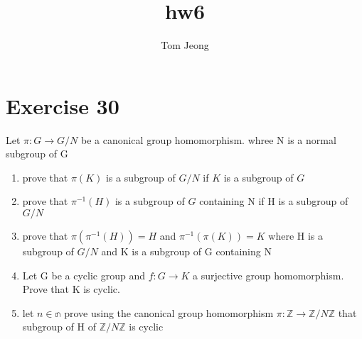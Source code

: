 \documentclass{article}
\begin{document}


\title{hw6}
\author{Tom Jeong}
\section*{Exercise 30} 
Let $\pi: G \to G/N $ be a canonical group homomorphism. whree N is a normal subgroup of G  \begin{enumerate}
    \item prove that $\pi(K)$ is a subgroup of $G/N$ if  $K$ is a subgroup of $G$ 
    \item prove that $\pi^{-1}(H)$ is a subgroup of $G$ containing N if H is a subgroup of $G/N$
    \item prove that $\pi(\pi^{-1}(H)) = H$ and $\pi^{-1}(\pi(K)) = K$ where H is a subgroup of $G/N$ and K is a subgroup of G containing N 
    \item Let G be a cyclic group and $f: G \to K $ a surjective group homomorphism. Prove that K is cyclic.
    \item let $n \in \mathbb{n}$ prove using the canonical group homomorphism $\pi: \mathbb{Z} \to \mathbb{Z} / N\mathbb{Z}$ that subgroup of H of $\mathbb{Z} / N\mathbb{Z}$ is cyclic 
\end{enumerate}
\end{document}
